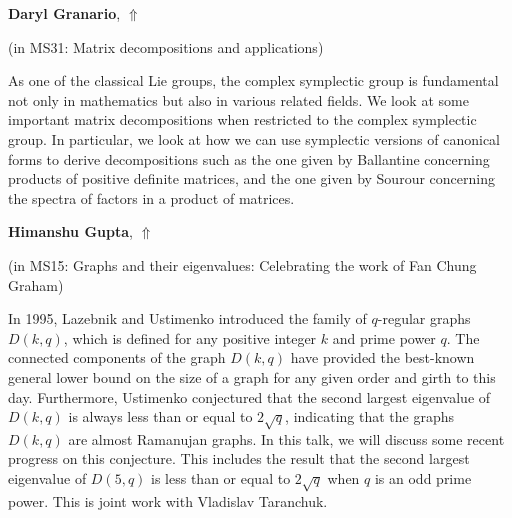 \documentclass[ILAS2025-program.tex]{subfiles}
\begin{document}
\hypertarget{down0310}{}\begin{ilasabstract}
    
\textbf{Daryl Granario},  \hfill \hyperlink{up0310}{$\Uparrow$}
    
    
(in {\color{mstitle}MS31: Matrix decompositions and applications})
        
\mtskip
    As one of the classical Lie groups, the complex symplectic group is fundamental not only in mathematics but also in various related fields. We look at some important matrix decompositions when restricted to the complex symplectic group. In particular, we look at how we can use symplectic versions of canonical forms to derive decompositions such as the one given by Ballantine concerning products of positive definite matrices, and the one given by Sourour concerning the spectra of factors in a product of matrices.

\end{ilasabstract}
    

\hypertarget{down0063}{}\begin{ilasabstract}
    
\textbf{Himanshu Gupta},  \hfill \hyperlink{up0063}{$\Uparrow$}
    
    
(in {\color{mstitle}MS15: Graphs and their eigenvalues: Celebrating the work of Fan Chung Graham})
        
\mtskip
    In 1995, Lazebnik and Ustimenko introduced the family of $q$-regular graphs $D(k, q)$, which is defined for any positive integer $k$ and prime power $q$. The connected components of the graph $D(k, q)$ have provided the best-known general lower bound on the size of a graph for any given order and girth to this day. Furthermore, Ustimenko conjectured that the second largest eigenvalue of $D(k, q)$ is always less than or equal to $2\sqrt{q}$, indicating that the graphs $D(k, q)$ are almost Ramanujan graphs. In this talk, we will discuss some recent progress on this conjecture. This includes the result that the second largest eigenvalue of $D(5, q)$ is less than or equal to $2\sqrt{q}$ when $q$ is an odd prime power. This is joint work with Vladislav Taranchuk.

\end{ilasabstract}
    
\end{document}
